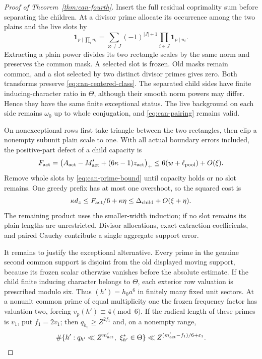 \documentclass[11pt,a4paper]{article}
\numberwithin{equation}{section}
\theoremstyle{definition}
\theoremstyle{remark}
\newcommand{\eps}{\varepsilon}
\begin{document}
\begin{proof}[Proof of Theorem~\ref{thm:can-fourth}]
Insert the full residual coprimality sum before separating the
children.  At a divisor prime allocate its occurrence among
the two plains and the live slots by
\[
 \mathbf1_{p\mid\prod_i n_i}
   =\sum_{\varnothing\ne J}(-1)^{|J|+1}
                             \prod_{i\in J}\mathbf1_{p\mid n_i}.
\]
Extracting a plain power divides its two rectangle scales by the
same norm and preserves the common mask.
A selected slot is frozen.  Old masks remain common, and a
slot selected by two distinct divisor primes gives zero.
Both transforms preserve \eqref{eq:can-centered-class}.
The separated child sides have finite inducing-character
ratio in $\Theta$, although their smooth norm powers may
differ.  Hence they have the same finite exceptional status.
The live background on each side remains $\omega_0$ up to
whole conjugation, and \eqref{eq:can-pairing} remains valid.

On nonexceptional rows first take triangle between the two
rectangles, then clip a nonempty subunit plain scale to one.
With all actual boundary errors included, the positive-part
defect of a child capacity is
\[
 F_{\rm act}=\bigl(A_{\rm act}-M'_{\rm act}
                       +(6\kappa-1)z_{\rm act}\bigr)_+
 \le6(w+\ell_{\rm pool})+O(\xi).
\]
Remove whole slots by \eqref{eq:can-prime-bound} until capacity
holds or no slot remains.  One greedy prefix has at most one
overshoot, so the squared cost is
\[
 \kappa d_z\le F_{\rm act}/6+\kappa\eta
          \le\Delta_{\rm child}+O(\xi+\eta).
\]
The remaining product uses the smaller-width induction; if
no slot remains its plain lengths are unrestricted.
Divisor allocations, exact extraction coefficients, and paired Cauchy
contribute a single aggregate support error.

It remains to justify the exceptional alternative.  Every
prime in the genuine second common support is disjoint from
the old displayed moving support, because its frozen scalar
otherwise vanishes before the absolute estimate.
If the child finite inducing character belongs to $\Theta$,
each exterior row valuation is prescribed modulo six.
Thus $(h')=h_0a^6$ in finitely many fixed unit sectors.
At a nonunit common prime of equal multiplicity one the
frozen frequency factor has valuation two, forcing
$v_p(h')\equiv4\pmod6$.
If the radical length of these primes is $v_1$, put $f_1=2v_1$;
then $q_{h_0}\ge Z^{2f_1}$ and, on a nonempty range,
\begin{equation}\label{eq:can-exceptional-count}
 \#\{h':q_{h'}\ll Z^{m'_{\rm act}},\ \xi_{h'}^*\in\Theta\}
 \ll Z^{(m'_{\rm act}-f_1)/6+\eps_1}.
\end{equation}


\end{proof}
\end{document}
